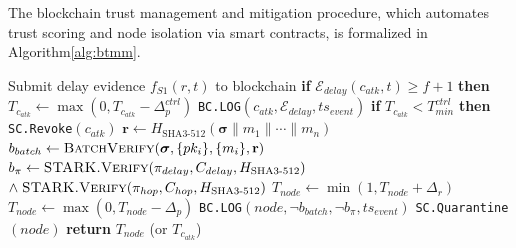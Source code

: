 \documentclass[12pt, a4paper]{report}
\begin{document}
{{The blockchain trust management and mitigation procedure, which
automates trust scoring and node isolation via smart contracts, is
formalized in Algorithm\ref{alg:btmm}.

\begin{algorithm}[htb]
\caption{Blockchain Trust Management and Mitigation
(\texttt{BTMM})}
\begin{algorithmic}[1]
\small
{}
    \State Submit delay evidence
           $f_{S1}(r,t)$ to blockchain
           \hfill{}
    \State \textbf{if} $\mathcal{E}_{delay}(c_{atk},t)
           \geq f{+}1$ \textbf{then}
    \State \quad $T_{c_{atk}} \gets
           \max(0,T_{c_{atk}}-\Delta_p^{ctrl})$
           \hfill{}
    \State \quad \texttt{BC.LOG}$(c_{atk},
           \mathcal{E}_{delay},ts_{event})$
    \State \textbf{if} $T_{c_{atk}}
           < T_{min}^{ctrl}$ \textbf{then}
    \State \quad \texttt{SC.Revoke}$(c_{atk})$
           \hfill{}
  \Else
    \State $\mathbf{r} \gets
           H_{\text{SHA3-512}}(
           \boldsymbol{\sigma}\|m_1\|\cdots\|m_n)$
    \State $b_{batch} \gets
           \textsc{BatchVerify}(\boldsymbol{\sigma},
           \{pk_i\},\{m_i\},\mathbf{r})$
           \hfill{}
    \State $b_{\pi} \gets
           \textsc{STARK.Verify}(\pi_{delay},
           C_{delay},H_{\text{SHA3-512}})$
           $\land\;\textsc{STARK.Verify}(\pi_{hop},
           C_{hop},H_{\text{SHA3-512}})$
      \State $T_{node} \gets
             \min(1,T_{node}+\Delta_r)$
             \hfill{}
    \Else
      \State $T_{node} \gets
             \max(0,T_{node}-\Delta_p)$
             \hfill{}
      \State \texttt{BC.LOG}$(node,
             \neg b_{batch},\neg b_{\pi},
             ts_{event})$
    \EndIf
      \State \texttt{SC.Quarantine}$(node)$
             \hfill{}
    \EndIf
  \EndIf
  \State \textbf{return} $T_{node}$ (or $T_{c_{atk}}$)
\EndProcedure
\end{algorithmic}
\label{alg:btmm}
\end{algorithm}

}}
\end{document}
